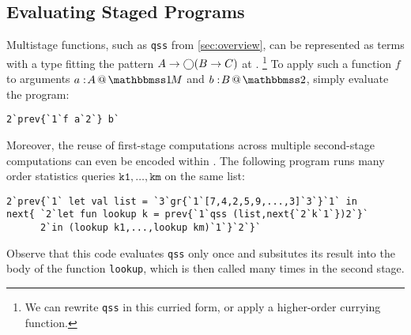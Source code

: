 \subsection{Evaluating Staged Programs}
\label{sec:topLevel}

Multistage functions, such as \texttt{qss} from \ref{sec:overview},
can be represented as terms with a type fitting the pattern \mbox{$A\to \bigcirc (B \to C)$} at \bbonem.%
\footnote{We can rewrite \texttt{qss} in this curried form, or apply a
higher-order currying function.} 
To apply such a function $f$ to arguments $\colmix a A$ and $\coltwo b B$, simply
evaluate the program:
\begin{lstlisting}
2`prev{`1`f a`2`} b`
\end{lstlisting}
Moreover, the reuse of first-stage computations across
multiple second-stage computations can even be encoded within \lang. 
The following program runs many order statistics queries
$\texttt{k1},\dots,\texttt{km}$ on the same list:
\begin{lstlisting}
2`prev{`1` let val list = `3`gr{`1`[7,4,2,5,9,...,3]`3`}`1` in 
next{ `2`let fun lookup k = prev{`1`qss (list,next{`2`k`1`})2`}`
      2`in (lookup k1,...,lookup km)`1`}`2`}`
\end{lstlisting}
Observe that this code evaluates \texttt{qss} only once
and subsitutes its result into the body of the function \texttt{lookup},
which is then called many times in the second stage.
